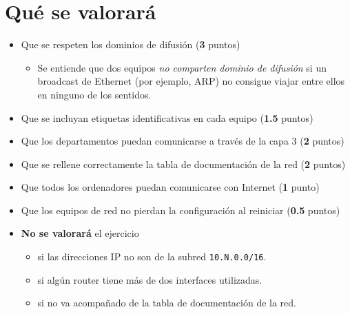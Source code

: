 \section{Qué se valorará}
\begin{itemize}
\item Que se respeten los dominios de difusión (\textbf{3} puntos)
  \begin{itemize}
  \item Se entiende que dos equipos \textit{no comparten dominio de difusión} si un broadcast de Ethernet (por ejemplo, ARP) no consigue viajar entre ellos en ninguno de los sentidos.
  \end{itemize}
\item Que se incluyan etiquetas identificativas en cada equipo (\textbf{1.5} puntos)  
\item Que los departamentos puedan comunicarse a través de la capa 3 (\textbf{2} puntos)
\item Que se rellene correctamente la tabla de documentación de la red (\textbf{2} puntos)
\item Que todos los ordenadores puedan comunicarse con Internet (\textbf{1} punto)
\item Que los equipos de red no pierdan la configuración al reiniciar (\textbf{0.5} puntos)
\item \textbf{No se valorará} el ejercicio
  \begin{itemize}
  \item si las direcciones IP no son de la subred \texttt{10.N.0.0/16}.
  \item si algún router tiene más de dos interfaces utilizadas.
  \item si no va acompañado de la tabla de documentación de la red.
  \end{itemize}
\end{itemize}




